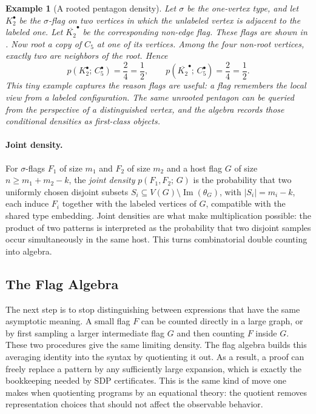 \documentclass{article}
\newtheorem{example}[theorem]{Example}
\newcommand{\den}[2]{p(#1;\,#2)}
\begin{document}
\begin{example}[A rooted pentagon density]
  Let $\sigma$ be the one-vertex type, and let $K_2^\bullet$ be the
  $\sigma$-flag on two vertices in which the unlabeled vertex is adjacent to
  the labeled one.  Let $\overline{K_2}^{\bullet}$ be the corresponding
  non-edge flag.  These flags are shown in .  Now root
  a copy of $C_5$ at one of its vertices.  Among the
  four non-root vertices, exactly two are neighbors of the root.  Hence
  \[
    \den{K_2^\bullet}{C_5^\bullet} = \frac{2}{4} = \frac12,
    \qquad
    \den{\overline{K_2}^{\bullet}}{C_5^\bullet} = \frac{2}{4} = \frac12.
  \]
  This tiny example captures the reason flags are useful: a flag remembers
  the local view from a labeled configuration.  The same unrooted pentagon can
  be queried from the perspective of a distinguished vertex, and the algebra
  records those conditional densities as first-class objects.
\end{example}

\paragraph{Joint density.}
For $\sigma$-flags $F_1$ of size $m_1$ and $F_2$ of size $m_2$ and a host
flag $G$ of size $n \geq m_1 + m_2 - k$, the \emph{joint density}
$\den{F_1,F_2}{G}$ is the probability that two uniformly chosen disjoint
subsets $S_i \subseteq V(G)\setminus \operatorname{Im}(\theta_G)$, with
$|S_i|=m_i-k$, each induce $F_i$ together with the labeled vertices of $G$,
compatible with the shared type embedding.
Joint densities are what make multiplication possible: the product of two
patterns is interpreted as the probability that two disjoint samples occur
simultaneously in the same host.  This turns combinatorial double counting
into algebra.

\subsection{The Flag Algebra}

The next step is to stop distinguishing between expressions that have the same
asymptotic meaning.  A small flag $F$ can be counted directly in a large graph,
or by first sampling a larger intermediate flag $G$ and then counting $F$
inside $G$.  These two procedures give the same limiting density.  The flag
algebra builds this averaging identity into the syntax by quotienting it out.
As a result, a proof can freely replace a pattern by any sufficiently large
expansion, which is exactly the bookkeeping needed by SDP certificates.  This
is the same kind of move one makes when quotienting programs by an equational
theory: the quotient removes representation choices that should not affect the
observable behavior.
\end{document}
